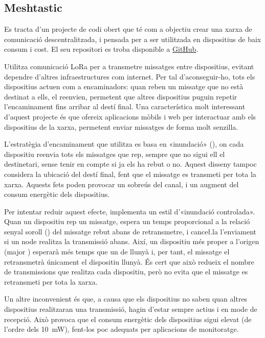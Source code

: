 \documentclass{tfgitic}[2024/07/01]
\begin{document}
\subsection{Meshtastic}
Es tracta d'un projecte de codi obert que té com a objectiu crear una xarxa de comunicació descentralitzada, i pensada per a ser utilitzada en dispositius de baix consum i cost. El seu repositori es troba disponible a \href{https://github.com/meshtastic}{GitHub}.

Utilitza comunicació LoRa per a transmetre missatges entre dispositius, evitant dependre d'altres infraestructures com internet. Per tal d'aconseguir-ho, tots els dispositius actuen com a encaminadors: quan reben un missatge que no està destinat a ells, el reenvien, permetent que altres dispositius puguin repetir l'encaminament fins arribar al destí final. Una característica molt interessant d'aquest projecte és que ofereix aplicacions mòbils i web per interactuar amb els dispositius de la xarxa, permetent enviar missatges de forma molt senzilla.

L'estratègia d'encaminament que utilitza es basa en «inundació» (), on cada dispositiu reenvia tots els missatges que rep, sempre que no sigui ell el destinetari, sense tenir en compte si ja els ha rebut o no. Aquest disseny tampoc considera la ubicació del destí final, fent que el missatge es transmeti per tota la xarxa. Aquests fets poden provocar un sobreús del canal, i un augment del consum energètic dels dispositius. 

Per intentar reduir aquest efecte, implementa un estil d'«inundació controlada». Quan un dispositiu rep un missatge, espera un temps proporcional a la relació senyal soroll () del missatge rebut abans de retransmetre, i cance\l.la l'enviament si un node realitza la transmissió abans. Així, un dispositiu més proper a l'origen (major ) esperarà més temps que un de llunyà i, per tant, el missatge el retransmetrà únicament el dispositiu llunyà. És cert que això redueix el nombre de transmissions que realitza cada dispositiu, però no evita que el missatge es retransmeti per tota la xarxa. 

Un altre inconvenient és que, a causa que els dispositius no saben quan altres dispositius realitzaran una transmissió, hagin d'estar sempre actius i en mode de recepció. Això provoca que el consum energètic dels dispositius sigui elevat (de l'ordre dels \SI{10}{\milli\watt}), fent-los poc adequats per aplicacions de monitoratge.
\end{document}
